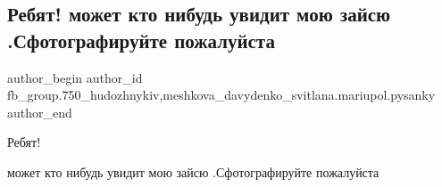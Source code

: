  
 
 
 
 

\subsection{Ребят!  может кто нибудь увидит мою зайсю .Сфотографируйте пожалуйста}
\label{sec:09_04_2018.fb.fb_group.750_hudozhnykiv.1.esli_kto_nibud_uvidit_moju_zaju}
 
\ifcmt
 author_begin
   author_id fb_group.750_hudozhnykiv,meshkova_davydenko_svitlana.mariupol.pysanky
 author_end
\fi

Ребят! 

может кто нибудь увидит мою зайсю .Сфотографируйте пожалуйста

